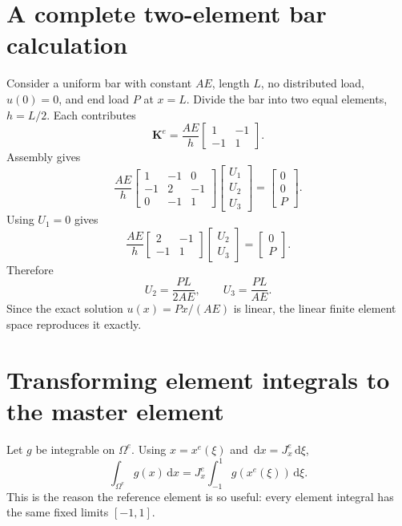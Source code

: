 \documentclass[11pt]{article}
\newcommand{\Om}{\Omega}
\newcommand{\dd}{\,\mathrm{d}}
\newcommand{\bKe}{\mathbf{K}^{e}}
\begin{document}
\section{A complete two-element bar calculation}

Consider a uniform bar with constant $AE$, length $L$, no distributed load,
$u(0)=0$, and end load $P$ at $x=L$. Divide the bar into two equal elements,
$h=L/2$. Each contributes
\[
\bKe
=
\frac{AE}{h}
\begin{bmatrix}1&-1\\-1&1\end{bmatrix}.
\]
Assembly gives
\[
\frac{AE}{h}
\begin{bmatrix}
1&-1&0\\
-1&2&-1\\
0&-1&1
\end{bmatrix}
\begin{bmatrix}U_1\\U_2\\U_3\end{bmatrix}
=
\begin{bmatrix}0\\0\\P\end{bmatrix}.
\]
Using $U_1=0$ gives
\[
\frac{AE}{h}
\begin{bmatrix}
2&-1\\
-1&1
\end{bmatrix}
\begin{bmatrix}U_2\\U_3\end{bmatrix}
=
\begin{bmatrix}0\\P\end{bmatrix}.
\]
Therefore
\[
U_2=\frac{PL}{2AE},
\qquad
U_3=\frac{PL}{AE}.
\]
Since the exact solution $u(x)=Px/(AE)$ is linear, the linear finite element
space reproduces it exactly.

\section{Transforming element integrals to the master element}

Let $g$ be integrable on $\Om^e$. Using $x=x^e(\xi)$ and
$\dd x=J_x^e\dd\xi$,
\begin{equation}
\boxed{
\int_{\Om^e}g(x)\dd x
=
J_x^e\int_{-1}^{1}g(x^e(\xi))\dd\xi.}
\label{eq:change-variable}
\end{equation}
This is the reason the reference element is so useful: every element integral
has the same fixed limits $[-1,1]$.
\end{document}
